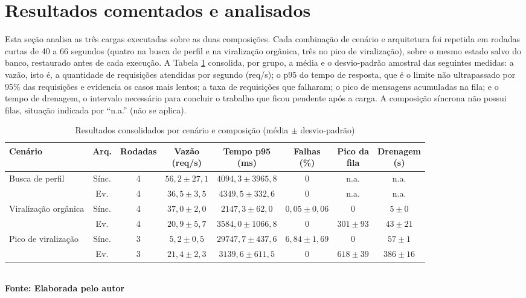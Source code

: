 \estrutura\section{\esp Resultados comentados e analisados}

Esta seção analisa as três cargas executadas sobre as duas composições. Cada combinação de cenário e arquitetura foi repetida em rodadas curtas de 40 a 66 segundos (quatro na busca de perfil e na viralização orgânica, três no pico de viralização), sobre o mesmo estado salvo do banco, restaurado antes de cada execução. A Tabela \ref{tab:resultados} consolida, por grupo, a média e o desvio-padrão amostral das seguintes medidas: a vazão, isto é, a quantidade de requisições atendidas por segundo (req/s); o p95 do tempo de resposta, que é o limite não ultrapassado por 95\% das requisições e evidencia os casos mais lentos; a taxa de requisições que falharam; o pico de mensagens acumuladas na fila; e o tempo de drenagem, o intervalo necessário para concluir o trabalho que ficou pendente após a carga. A composição síncrona não possui filas, situação indicada por ``n.a.'' (não se aplica).

\begin{table}[H]
	\centering
	\caption{Resultados consolidados por cenário e composição (média $\pm$ desvio-padrão)}
	\vspace{-0.3cm}
	\label{tab:resultados}
	\footnotesize
	\setlength{\tabcolsep}{4pt}
	\begin{tabular}{l|c|c|c|c|c|c|c}
	\hline
	\textbf{Cenário} & \textbf{Arq.} & \textbf{Rodadas} & \shortstack{\textbf{Vazão}\\\textbf{(req/s)}} & \shortstack{\textbf{Tempo p95}\\\textbf{(ms)}} & \shortstack{\textbf{Falhas}\\\textbf{(\%)}} & \shortstack{\textbf{Pico da}\\\textbf{fila}} & \shortstack{\textbf{Drenagem}\\\textbf{(s)}} \\
	\hline
	Busca de perfil & Sínc. & 4 & $56{,}2 \pm 27{,}1$ & $4094{,}3 \pm 3965{,}8$ & $0$ & n.a. & n.a. \\
	                      & Ev.   & 4 & $36{,}5 \pm 3{,}5$ & $4349{,}5 \pm 332{,}6$ & $0$ & n.a. & n.a. \\
	Viralização orgânica & Sínc. & 4 & $37{,}0 \pm 2{,}0$ & $2147{,}3 \pm 62{,}0$ & $0{,}05 \pm 0{,}06$ & $0$ & $5 \pm 0$ \\
	                      & Ev.   & 4 & $20{,}9 \pm 5{,}7$ & $3584{,}0 \pm 1066{,}8$ & $0$ & $301 \pm 93$ & $43 \pm 21$ \\
	Pico de viralização  & Sínc. & 3 & $5{,}2 \pm 0{,}5$ & $29747{,}7 \pm 437{,}6$ & $6{,}84 \pm 1{,}69$ & $0$ & $57 \pm 1$ \\
	                      & Ev.   & 3 & $21{,}4 \pm 2{,}3$ & $3139{,}6 \pm 611{,}5$ & $0$ & $618 \pm 39$ & $386 \pm 16$ \\
	\hline
	\end{tabular}
	\vspace{.1cm}
	{\footnotesize\\ \textbf{Fonte: Elaborada pelo autor}}
\end{table}


